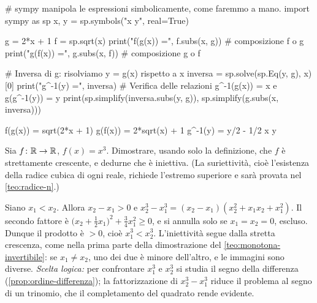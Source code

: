 \begin{python}
# sympy manipola le espressioni simbolicamente, come faremmo a mano.
import sympy as sp
x, y = sp.symbols("x y", real=True)

g = 2*x + 1
f = sp.sqrt(x)
print("f(g(x)) =", f.subs(x, g))         # composizione f o g
print("g(f(x)) =", g.subs(x, f))         # composizione g o f

# Inversa di g: risolviamo y = g(x) rispetto a x
inversa = sp.solve(sp.Eq(y, g), x)[0]
print("g^-1(y) =", inversa)
# Verifica delle relazioni g^-1(g(x)) = x e g(g^-1(y)) = y
print(sp.simplify(inversa.subs(y, g)),
      sp.simplify(g.subs(x, inversa)))
\end{python}
\begin{risultato}
f(g(x)) = sqrt(2*x + 1)
g(f(x)) = 2*sqrt(x) + 1
g^-1(y) = y/2 - 1/2
x y
\end{risultato}

\begin{esercizio}
Sia $f\colon\mathbb{R}\to\mathbb{R}$, $f(x)=x^{3}$. Dimostrare, usando solo la definizione, che $f$ è
strettamente crescente, e dedurne che è iniettiva. (La suriettività, cioè l'esistenza
della radice cubica di ogni reale, richiede l'estremo superiore e sarà provata nel
\cref{teo:radice-n}.)
\begin{soluzione}
Siano $x_{1}<x_{2}$. Allora $x_{2}-x_{1}>0$ e
$x_{2}^{3}-x_{1}^{3}=(x_{2}-x_{1})(x_{2}^{2}+x_{1}x_{2}+x_{1}^{2})$. Il secondo fattore
è $\bigl(x_{2}+\tfrac12x_{1}\bigr)^{2}+\tfrac34x_{1}^{2}\ge0$, e si annulla solo se
$x_{1}=x_{2}=0$, escluso. Dunque il prodotto è $>0$, cioè $x_{1}^{3}<x_{2}^{3}$.
L'iniettività segue dalla stretta crescenza, come nella prima parte della dimostrazione
del \cref{teo:monotona-invertibile}: se $x_{1}\neq x_{2}$, uno dei due è minore
dell'altro, e le immagini sono diverse. \emph{Scelta logica:} per confrontare
$x_{1}^{3}$ e $x_{2}^{3}$ si studia il segno della differenza
(\cref{prop:ordine-differenza}); la fattorizzazione di $x_{2}^{3}-x_{1}^{3}$ riduce il
problema al segno di un trinomio, che il completamento del quadrato rende evidente.
\end{soluzione}
\end{esercizio}
